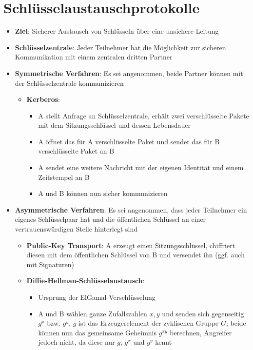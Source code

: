 \section{Schlüsselaustauschprotokolle}%
\label{schaus:sec:schluesselaustauschprotokolle}

\begin{itemize}
	\item \textbf{Ziel}: Sicherer Austausch von Schlüsseln über eine unsichere Leitung
	\item \textbf{Schlüsselzentrale}: Jeder Teilnehmer hat die Möglichkeit zur sicheren Kommunikation mit einem zentralen dritten Partner
	\item \textbf{Symmetrische Verfahren}: Es sei angenommen, beide Partner können mit der Schlüsselzentrale kommunizieren
	\begin{itemize}
		\item \textbf{Kerberos}:
		\begin{itemize}
			\item A stellt Anfrage an Schlüsselzentrale, erhält zwei verschlüsselte Pakete mit dem Sitzungsschlüssel und dessen Lebensdauer
			\item A öffnet das für A verschlüsselte Paket und sendet das für B verschlüsselte Paket an B
			\item A sendet eine weitere Nachricht mit der eigenen Identität und einem Zeitstempel an B
			\item A und B können nun sicher kommunizieren
		\end{itemize}
	\end{itemize}
	\item \textbf{Asymmetrische Verfahren}: Es sei angenommen, dass jeder Teilnehmer ein eigenes Schlüsselpaar hat und die öffentlichen Schlüssel an einer vertrauenswürdigen Stelle hinterlegt sind
	\begin{itemize}
		\item \textbf{Public-Key Transport}: A erzeugt einen Sitzungsschlüssel, chiffriert diesen mit dem öffentlichen Schlüssel von B und versendet ihn (ggf. auch mit Signaturen)
		\item \textbf{Diffie-Hellman-Schlüsselaustausch}:
		\begin{itemize}
			\item Ursprung der ElGamal-Verschlüsselung
			\item A und B wählen ganze Zufallszahlen $x, y$ und senden sich gegenseitig $g^x$ bzw. $g^y$, $g$ ist das Erzeugerelement der zyklischen Gruppe $G$; beide können nun das gemeinsame Geheimnis $g^{xy}$ berechnen, Angreifer jedoch nicht, da diese nur $g$, $g^x$ und $g^y$ kennt

\end{itemize}
\end{itemize}
\end{itemize}
